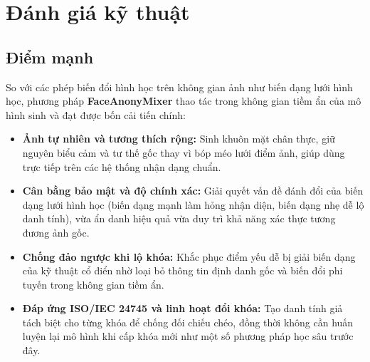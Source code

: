 \documentclass[oneside,a4paper,12pt]{extarticle}
\begin{document}
\section{Đánh giá kỹ thuật}
\label{sec::danh-gia-han-che}

\subsection{Điểm mạnh}
So với các phép biến đổi hình học trên không gian ảnh như biến dạng lưới hình học, phương pháp \textbf{FaceAnonyMixer} thao tác trong không gian tiềm ẩn của mô hình sinh và đạt được bốn cải tiến chính:
\begin{itemize}\setlength{\itemsep}{2pt}\setlength{\parskip}{0pt}
    \item \textbf{Ảnh tự nhiên và tương thích rộng:} Sinh khuôn mặt chân thực, giữ nguyên biểu cảm và tư thế gốc thay vì bóp méo lưới điểm ảnh, giúp dùng trực tiếp trên các hệ thống nhận dạng chuẩn.
    \item \textbf{Cân bằng bảo mật và độ chính xác:} Giải quyết vấn đề đánh đổi của biến dạng lưới hình học (biến dạng mạnh làm hỏng nhận diện, biến dạng nhẹ dễ lộ danh tính), vừa ẩn danh hiệu quả vừa duy trì khả năng xác thực tương đương ảnh gốc.
    \item \textbf{Chống đảo ngược khi lộ khóa:} Khắc phục điểm yếu dễ bị giải biến dạng của kỹ thuật cổ điển nhờ loại bỏ thông tin định danh gốc và biến đổi phi tuyến trong không gian tiềm ẩn.
    \item \textbf{Đáp ứng ISO/IEC 24745 và linh hoạt đổi khóa:} Tạo danh tính giả tách biệt cho từng khóa để chống đối chiếu chéo, đồng thời không cần huấn luyện lại mô hình khi cấp khóa mới như một số phương pháp học sâu trước đây.
\end{itemize}
\end{document}
